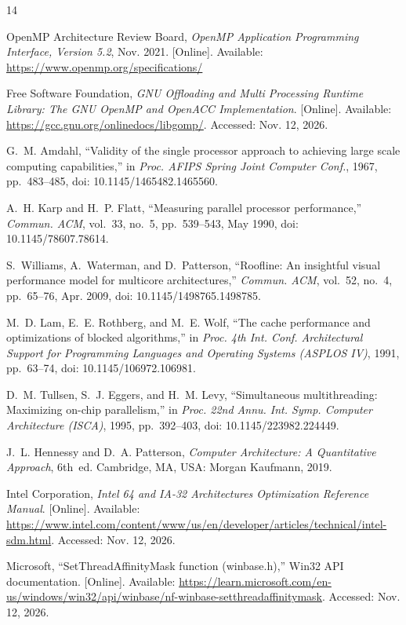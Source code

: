 \documentclass[11pt,a4paper]{article}
\begin{document}
{\footnotesize
\begin{thebibliography}{14}
\setlength{\itemsep}{0pt}\setlength{\parsep}{0pt}

OpenMP Architecture Review Board, \textit{OpenMP Application Programming Interface,
Version 5.2}, Nov. 2021. [Online]. Available: \url{https://www.openmp.org/specifications/}

Free Software Foundation, \textit{GNU Offloading and Multi Processing Runtime Library: The
GNU OpenMP and OpenACC Implementation}. [Online]. Available:
\url{https://gcc.gnu.org/onlinedocs/libgomp/}. Accessed: Nov. 12, 2026.

G.~M. Amdahl, ``Validity of the single processor approach to achieving large scale
computing capabilities,'' in \textit{Proc. AFIPS Spring Joint Computer Conf.}, 1967,
pp.~483--485, doi: 10.1145/1465482.1465560.

A.~H. Karp and H.~P. Flatt, ``Measuring parallel processor performance,''
\textit{Commun. ACM}, vol.~33, no.~5, pp.~539--543, May 1990, doi: 10.1145/78607.78614.

S.~Williams, A.~Waterman, and D.~Patterson, ``Roofline: An insightful visual performance
model for multicore architectures,'' \textit{Commun. ACM}, vol.~52, no.~4, pp.~65--76,
Apr. 2009, doi: 10.1145/1498765.1498785.

M.~D. Lam, E.~E. Rothberg, and M.~E. Wolf, ``The cache performance and optimizations of
blocked algorithms,'' in \textit{Proc. 4th Int. Conf. Architectural Support for
Programming Languages and Operating Systems (ASPLOS IV)}, 1991, pp.~63--74,
doi: 10.1145/106972.106981.

D.~M. Tullsen, S.~J. Eggers, and H.~M. Levy, ``Simultaneous multithreading: Maximizing
on-chip parallelism,'' in \textit{Proc. 22nd Annu. Int. Symp. Computer Architecture
(ISCA)}, 1995, pp.~392--403, doi: 10.1145/223982.224449.

J.~L. Hennessy and D.~A. Patterson, \textit{Computer Architecture: A Quantitative
Approach}, 6th~ed. Cambridge, MA, USA: Morgan Kaufmann, 2019.

Intel Corporation, \textit{Intel 64 and IA-32 Architectures Optimization Reference Manual}.
[Online]. Available:
\url{https://www.intel.com/content/www/us/en/developer/articles/technical/intel-sdm.html}.
Accessed: Nov. 12, 2026.

Microsoft, ``SetThreadAffinityMask function (winbase.h),'' Win32 API documentation.
[Online]. Available:
\url{https://learn.microsoft.com/en-us/windows/win32/api/winbase/nf-winbase-setthreadaffinitymask}.
Accessed: Nov. 12, 2026.


\end{thebibliography}}
\end{document}
